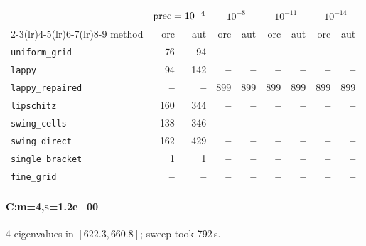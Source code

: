 \begin{center}
\small
\begin{tabular}{lrrrrrrrr}
\toprule
& \multicolumn{2}{c}{$\mathrm{prec}=10^{-4}$} & \multicolumn{2}{c}{$10^{-8}$} & \multicolumn{2}{c}{$10^{-11}$} & \multicolumn{2}{c}{$10^{-14}$} \\
\cmidrule(lr){2-3}\cmidrule(lr){4-5}\cmidrule(lr){6-7}\cmidrule(lr){8-9}
method & orc & aut & orc & aut & orc & aut & orc & aut \\
\midrule
\texttt{uniform\_grid} & 76 & 94 & \textbf{--} & \textbf{--} & \textbf{--} & \textbf{--} & \textbf{--} & \textbf{--} \\
\texttt{lappy} & 94 & 142 & \textbf{--} & \textbf{--} & \textbf{--} & \textbf{--} & \textbf{--} & \textbf{--} \\
\texttt{lappy\_repaired} & \textbf{--} & \textbf{--} & 899 & 899 & 899 & 899 & 899 & 899 \\
\texttt{lipschitz} & 160 & 344 & \textbf{--} & \textbf{--} & \textbf{--} & \textbf{--} & \textbf{--} & \textbf{--} \\
\texttt{swing\_cells} & 138 & 346 & \textbf{--} & \textbf{--} & \textbf{--} & \textbf{--} & \textbf{--} & \textbf{--} \\
\texttt{swing\_direct} & 162 & 429 & \textbf{--} & \textbf{--} & \textbf{--} & \textbf{--} & \textbf{--} & \textbf{--} \\
\midrule
\texttt{single\_bracket} & 1 & 1 & \textbf{--} & \textbf{--} & \textbf{--} & \textbf{--} & \textbf{--} & \textbf{--} \\
\texttt{fine\_grid} & \textbf{--} & \textbf{--} & \textbf{--} & \textbf{--} & \textbf{--} & \textbf{--} & \textbf{--} & \textbf{--} \\
\bottomrule
\end{tabular}
\end{center}

\paragraph{C:m=4,s=1.2e+00} 4 eigenvalues in $[622.3, 660.8]$; sweep took 792\,s.

